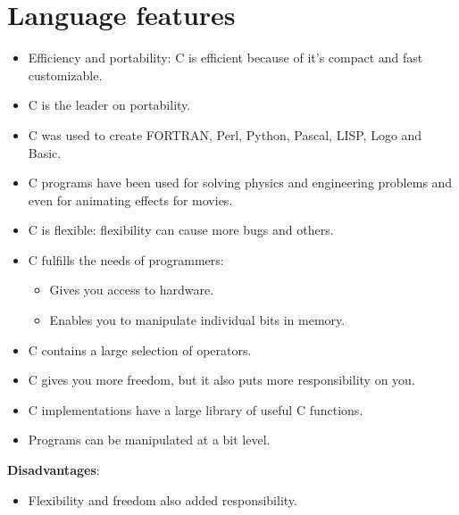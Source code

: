 \section{Language features}
\begin{itemize}
    \item Efficiency and portability: C is efficient because of it's compact and fast customizable. 
    \item C is the leader on portability. 
    \item C was used to create FORTRAN, Perl, Python, Pascal, LISP, Logo and Basic. 
    \item C programs have been used for solving physics and engineering problems and even for animating effects for movies. 
    \item C is flexible: flexibility can cause more bugs and others. 
    \item C fulfills the needs of programmers: 
        \begin{itemize}
            \item Gives you access to hardware. 
            \item Enables you to manipulate individual bits in memory. 
        \end{itemize}
    
    \item C contains a large selection of operators. 
    \item C gives you more freedom, but it also puts more responsibility on you. 
    \item C implementations have a large library of useful C functions. 
    \item Programs can be manipulated at a bit level. 
\end{itemize}
\textbf{Disadvantages}:
\begin{itemize}
    \item Flexibility and freedom also added responsibility. 
\end{itemize}


